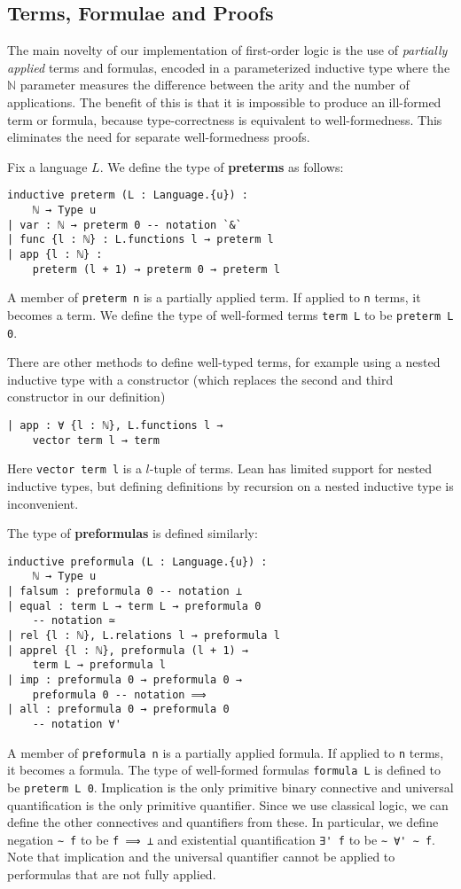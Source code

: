 \documentclass[sigplan,10pt,review, anonymous]{acmart}
\newcommand{\lil}{\lstinline}
\newcommand{\N}{\mathbb{N}}
\theoremstyle{definition}
\begin{document}
\subsection{Terms, Formulae and Proofs}
\label{subsection:fol:terms}
The main novelty of our implementation of first-order logic is the use of \emph{partially applied} terms and formulas, encoded in a parameterized inductive type where the $\N$ parameter measures the difference between the arity and the number of applications.
The benefit of this is that it is impossible to produce an ill-formed term or formula, because type-correctness is equivalent to well-formedness.
This eliminates the need for separate well-formedness proofs.

Fix a language $L$. We define the type of \textbf{preterms} as follows:
\begin{lstlisting}
inductive preterm (L : Language.{u}) :
    ℕ → Type u
| var : ℕ → preterm 0 -- notation `&`
| func {l : ℕ} : L.functions l → preterm l
| app {l : ℕ} :
    preterm (l + 1) → preterm 0 → preterm l
\end{lstlisting}
A member of \lil{preterm n} is a partially applied term.
If applied to \lil{n} terms, it becomes a term.
We define the type of well-formed terms \lil{term L} to be \lil{preterm L 0}.

There are other methods to define well-typed terms, for example using a nested inductive type with a constructor (which replaces the second and third constructor in our definition)
\begin{lstlisting}
| app : ∀ {l : ℕ}, L.functions l →
    vector term l → term
\end{lstlisting}
Here \lil{vector term l} is a $l$-tuple of terms.
Lean has limited support for nested inductive types, but defining definitions by recursion on a nested inductive type is inconvenient.

The type of \textbf{preformulas} is defined similarly:
\begin{lstlisting}
inductive preformula (L : Language.{u}) :
    ℕ → Type u
| falsum : preformula 0 -- notation ⊥
| equal : term L → term L → preformula 0
    -- notation ≃
| rel {l : ℕ}, L.relations l → preformula l
| apprel {l : ℕ}, preformula (l + 1) →
    term L → preformula l
| imp : preformula 0 → preformula 0 →
    preformula 0 -- notation ⟹
| all : preformula 0 → preformula 0
    -- notation ∀'
\end{lstlisting}
A member of \lil{preformula n} is a partially applied formula.
If applied to \lil{n} terms, it becomes a formula.
The type of well-formed formulas \lil{formula L} is defined to be \lil{preterm L 0}.
Implication is the only primitive binary connective and universal quantification is the only primitive quantifier. Since we use classical logic, we can define the other connectives and quantifiers from these.
In particular, we define negation \lil{∼ f} to be \lil{f ⟹ ⊥} and existential quantification \lil{∃' f} to be \lil{∼ ∀' ∼ f}.
Note that implication and the universal quantifier cannot be applied to performulas that are not fully applied.
\end{document}
